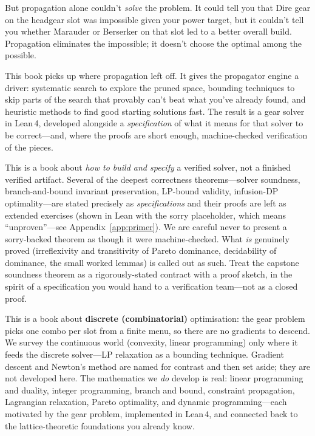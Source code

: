 \documentclass[11pt, a4paper, oneside]{book}
\newcommand{\li}[1]{{\ttfamily\small\color{deepblue}#1}}
\begin{document}
But propagation alone couldn't \emph{solve} the problem.  It could tell you
that Dire gear on the headgear slot was impossible given your power target, but
it couldn't tell you whether Marauder or Berserker on that slot led to a better
overall build.  Propagation eliminates the impossible; it doesn't choose the
optimal among the possible.

This book picks up where propagation left off.  It gives the propagator engine
a driver: systematic search to explore the pruned space, bounding techniques to
skip parts of the search that provably can't beat what you've already found, and
heuristic methods to find good starting solutions fast.  The result is a
gear solver in Lean\,4, developed alongside a \emph{specification} of what it
means for that solver to be correct---and, where the proofs are short enough,
machine-checked verification of the pieces.

\begin{warningbox}[title={An honest word about ``verified''}]
This is a book about \emph{how to build and specify} a verified solver, not a
finished verified artifact.  Several of the deepest correctness
theorems---solver soundness, branch-and-bound invariant preservation, LP-bound
validity, infusion-DP optimality---are stated precisely as \emph{specifications}
and their proofs are left as extended exercises (shown in Lean with the
\li{sorry} placeholder, which means ``unproven''---see
Appendix~\ref{app:primer}).  We are careful never to present a \li{sorry}-backed
theorem as though it were machine-checked.  What \emph{is} genuinely proved
(irreflexivity and transitivity of Pareto dominance, decidability of dominance,
the small worked lemmas) is called out as such.  Treat the capstone soundness
theorem as a rigorously-stated contract with a proof sketch, in the spirit of a
specification you would hand to a verification team---not as a closed proof.
\end{warningbox}

This is a book about \textbf{discrete (combinatorial)} optimisation: the gear
problem picks one combo per slot from a finite menu, so there are no gradients
to descend.  We survey the continuous world (convexity, linear programming) only
where it feeds the discrete solver---LP relaxation as a bounding technique.
Gradient descent and Newton's method are named for contrast and then set aside;
they are not developed here.  The mathematics we \emph{do} develop is real:
linear programming and duality, integer programming, branch and bound,
constraint propagation, Lagrangian relaxation, Pareto optimality, and dynamic
programming---each motivated by the gear problem, implemented in Lean\,4, and
connected back to the lattice-theoretic foundations you already know.
\end{document}
